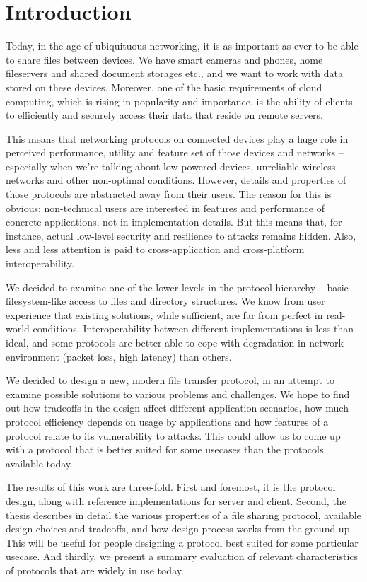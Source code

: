 \chapter*{Introduction}

Today, in the age of ubiquituous networking, it is as important as ever to be able to share files between
devices. We have smart cameras and phones, home fileservers and shared document storages etc., and we want to
work with data stored on these devices. Moreover, one of the basic requirements of cloud computing, which is
rising in popularity and importance, is the ability of clients to efficiently and securely access their data
that reside on remote servers.

This means that networking protocols on connected devices play a huge role in perceived performance, utility
and feature set of those devices and networks -- especially when we're talking about low-powered devices,
unreliable wireless networks and other non-optimal conditions. However, details and properties of those
protocols are abstracted away from their users. The reason for this is obvious: non-technical users are
interested in features and performance of concrete applications, not in implementation details. But this means
that, for instance, actual low-level security and resilience to attacks remains hidden. Also, less and less
attention is paid to cross-application and cross-platform interoperability.

We decided to examine one of the lower levels in the protocol hierarchy -- basic filesystem-like access to
files and directory structures. We know from user experience that existing solutions, while sufficient, are
far from perfect in real-world conditions. Interoperability between different implementations is less than ideal,
and some protocols are better able to cope with degradation in network environment (packet loss, high latency)
than others.

We decided to design a new, modern file transfer protocol, in an attempt to examine possible solutions to
various problems and challenges. We hope to find out how tradeoffs in the design affect different application
scenarios, how much protocol efficiency depends on usage by applications and how features of a protocol relate
to its vulnerability to attacks. This could allow us to come up with a protocol that is better suited for some
usecases than the protocols available today.

The results of this work are three-fold. First and foremost, it is the protocol design, along with reference
implementations for server and client. Second, the thesis describes in detail the various properties of a file
sharing protocol, available design choices and tradeoffs, and how design process works from the ground up.
This will be useful for people designing a protocol best suited for some particular usecase. And thirdly, we
present a summary evaluation of relevant characteristics of protocols that are widely in use today.
